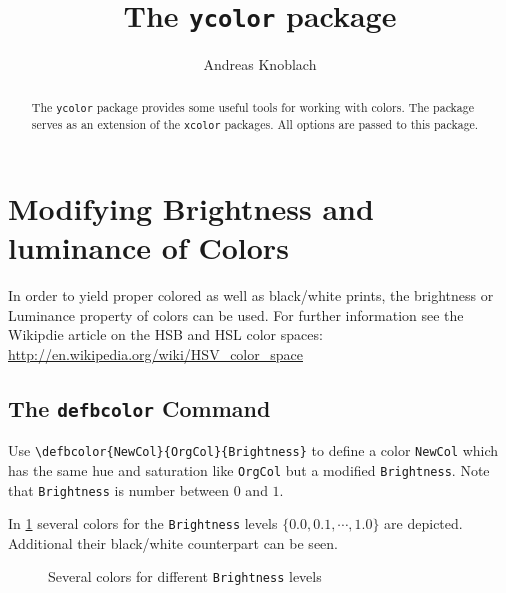 \documentclass[11pt,DIV=12]{scrartcl}
\title{The \lstinline!ycolor! package}
\author{Andreas Knoblach}
\begin{document}
%
\maketitle

\begin{abstract}
The \lstinline!ycolor! package provides some useful tools for working with colors. The package serves as an extension of the \lstinline!xcolor! packages. All options are passed to this package.
\end{abstract}

%
\section{Modifying Brightness and luminance of Colors}
In order to yield proper colored as well as black/white prints, the brightness or Luminance property of colors can be used. For further information see the Wikipdie article on the HSB and HSL color spaces: \url{http://en.wikipedia.org/wiki/HSV_color_space}

%
%
\subsection[The defbcolor Command]{The \lstinline!defbcolor! Command}
Use \lstinline!\defbcolor{NewCol}{OrgCol}{Brightness}! to define a color \lstinline!NewCol! which has the same hue and saturation like \lstinline!OrgCol! but a modified \lstinline!Brightness!. Note that \lstinline!Brightness! is number between $0$ and $1$.

In \cref{fig:brightness} several colors for the \lstinline!Brightness! levels $\{0.0, 0.1, \cdots, 1.0\}$ are depicted. Additional their black/white counterpart can be seen.
\begin{figure}[h]
	\centering
	\caption{Several colors for different \lstinline!Brightness! levels}
	\label{fig:brightness}
\end{figure}
\end{document}
